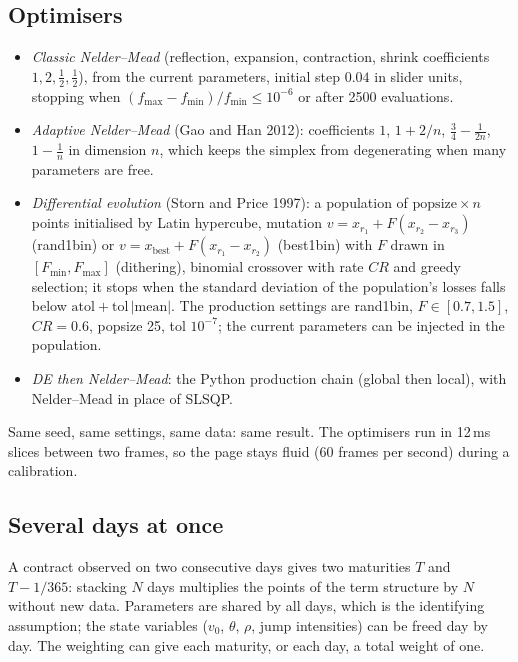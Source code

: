 \documentclass[11pt,a4paper]{article}
\theoremstyle{definition}
\theoremstyle{remark}
\begin{document}
\subsection{Optimisers}
\begin{itemize}
  \item \emph{Classic Nelder--Mead} (reflection, expansion, contraction, shrink coefficients $1,2,\tfrac12,\tfrac12$), from the
        current parameters, initial step $0.04$ in slider units, stopping when $(f_{\max}-f_{\min})/f_{\min}\le10^{-6}$ or after
        2500 evaluations.
  \item \emph{Adaptive Nelder--Mead} (Gao and Han 2012): coefficients $1$, $1+2/n$, $\tfrac34-\tfrac1{2n}$, $1-\tfrac1n$ in dimension
        $n$, which keeps the simplex from degenerating when many parameters are free.
  \item \emph{Differential evolution} (Storn and Price 1997): a population of $\text{popsize}\times n$ points initialised by Latin
        hypercube, mutation $v=x_{r_1}+F(x_{r_2}-x_{r_3})$ (rand1bin) or $v=x_{\text{best}}+F(x_{r_1}-x_{r_2})$ (best1bin) with $F$
        drawn in $[F_{\min},F_{\max}]$ (dithering), binomial crossover with rate $CR$ and greedy selection; it stops when the
        standard deviation of the population's losses falls below $\text{atol}+\text{tol}\,|\text{mean}|$. The production settings
        are rand1bin, $F\in[0.7,1.5]$, $CR=0.6$, popsize 25, tol $10^{-7}$; the current parameters can be injected in the population.
  \item \emph{DE then Nelder--Mead}: the Python production chain (global then local), with Nelder--Mead in place of SLSQP.
\end{itemize}
Same seed, same settings, same data: same result. The optimisers run in 12\,ms slices between two frames, so the page stays
fluid (60 frames per second) during a calibration.

\subsection{Several days at once}\label{sec:stack}
A contract observed on two consecutive days gives two maturities $T$ and $T-1/365$: stacking $N$ days multiplies the points of
the term structure by $N$ without new data. Parameters are shared by all days, which is the identifying assumption; the state
variables ($v_0$, $\theta$, $\rho$, jump intensities) can be freed day by day. The weighting can give each maturity, or each day,
a total weight of one.
\end{document}
